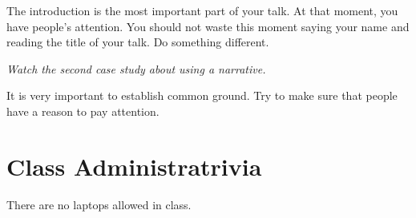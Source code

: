 \documentclass{article}
\begin{document}
The introduction is the most important part of your talk. At that moment, you
have people's attention. You should not waste this moment saying your name and
reading the title of your talk. Do something different.

\bigbreak

\textit{Watch the second case study about using a narrative.}

\bigbreak

It is very important to establish common ground. Try to make sure that people
have a reason to pay attention.

\section{ Class Administratrivia }

There are no laptops allowed in class.
\end{document}
